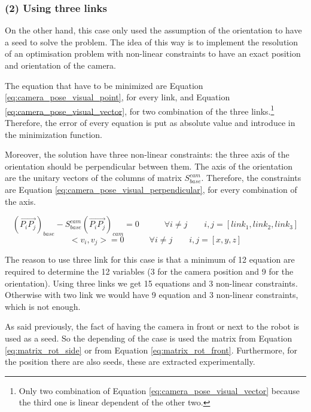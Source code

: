 \documentclass[12pt,a4paper,final,twoside,openright]{report}
\begin{document}
\vspace{-20pt}
\subsubsection{(2) Using three links}

On the other hand, this case only used the assumption of the orientation to have a seed to solve the problem. The idea of this way is to implement the resolution of an optimisation problem with non-linear constraints to have an exact position and orientation of the camera.

The equation that have to be minimized are Equation \eqref{eq:camera_pose_visual_point}, for every link, and Equation 
\eqref{eq:camera_pose_visual_vector}, for two combination of the three links.\footnote{Only two combination of Equation \eqref{eq:camera_pose_visual_vector} because the third one is linear dependent of the other two.} Therefore, the error of every equation is put as absolute value and introduce in the minimization function. 

Moreover, the solution have three non-linear constraints: the three axis of the orientation should be perpendicular between them. The axis of the orientation are the unitary vectors of the columns of matrix $S_{base}^{cam}$. Therefore, the constraints are Equation \eqref{eq:camera_pose_visual_perpendicular}, for every combination of the axis. 

\begin{equation}\label{eq:camera_pose_visual_vector}
\left( \overrightarrow{P_iP_j} \right)_{base} - S_{base}^{cam} \left( \overrightarrow{P_iP_j} \right)_{cam} = 0  \quad \quad \quad \forall i \neq j \quad \quad i,j=\left[ link_1,link_2,link_3 \right]
\end{equation}
\begin{equation}\label{eq:camera_pose_visual_perpendicular}
<v_i , v_j > = 0 \quad \quad \quad \forall i \neq j \quad \quad i,j=\left[x,y,z\right]
\end{equation}

The reason to use three link for this case is that a minimum of 12 equation are required to determine the 12 variables (3 for the camera position and 9 for the orientation). Using three links we get 15 equations and 3 non-linear constraints. Otherwise with two link we would have 9 equation and 3 non-linear constraints, which is not enough.

As said previously, the fact of having the camera in front or next to the robot is used as a seed. So the depending of the case is used the matrix from Equation \eqref{eq:matrix_rot_side} or from Equation \eqref{eq:matrix_rot_front}. Furthermore, for the position there are also seeds, these are extracted experimentally.
\end{document}
